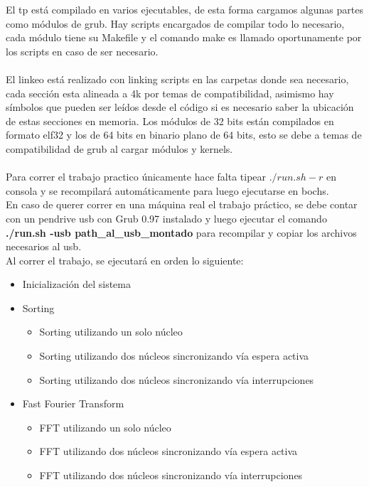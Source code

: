     El tp está compilado en varios ejecutables, de esta forma cargamos algunas partes como módulos de grub.
    Hay scripts encargados de compilar todo lo necesario, cada módulo tiene su Makefile y el comando make es llamado
    oportunamente por los scripts en caso de ser necesario.
    \\
    \\
    El linkeo está realizado con linking scripts en las carpetas donde sea necesario,
    cada sección esta alineada a 4k por temas de compatibilidad, asimismo hay símbolos que pueden ser leídos desde el código si es necesario saber la ubicación de estas secciones en memoria.
    Los módulos de 32 bits están compilados en formato elf32 y los de 64 bits en binario plano de 64 bits, esto se debe a temas de compatibilidad de grub al cargar módulos y kernels.
    \\
    \\
    Para correr el trabajo practico únicamente hace falta tipear $./run.sh -r$ en consola y se recompilará automáticamente para luego ejecutarse en bochs.\\
    En caso de querer correr en una máquina real el trabajo práctico, se debe contar con un pendrive usb con Grub 0.97 instalado y luego ejecutar el comando \textbf{./run.sh -usb path\_al\_usb\_montado} para recompilar y copiar los archivos necesarios al usb.\\
    Al correr el trabajo, se ejecutará en orden lo siguiente:
    \begin{itemize}
        \item Inicialización del sistema
        \item Sorting \begin{itemize}
                    \item Sorting utilizando un solo núcleo
                    \item Sorting utilizando dos núcleos sincronizando vía espera activa
                    \item Sorting utilizando dos núcleos sincronizando vía interrupciones
              \end{itemize}
        \item Fast Fourier Transform \begin{itemize}
                    \item FFT utilizando un solo núcleo
                    \item FFT utilizando dos núcleos sincronizando vía espera activa
                    \item FFT utilizando dos núcleos sincronizando vía interrupciones
              \end{itemize}
    \end{itemize}
